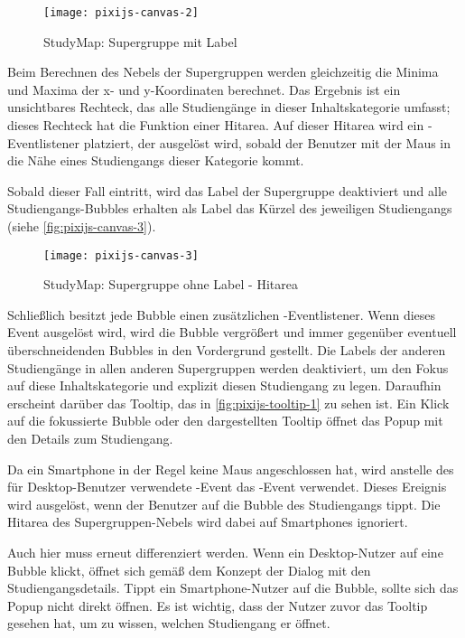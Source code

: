 \begin{figure}[H]
    \centering
    \texttt{[image: pixijs-canvas-2]}
    \caption{StudyMap: Supergruppe mit Label}
    \label{fig:pixijs-canvas-2}
\end{figure}

Beim Berechnen des Nebels der Supergruppen werden gleichzeitig die Minima und Maxima der x- und y-Koordinaten berechnet. Das Ergebnis ist ein unsichtbares Rechteck, das alle Studiengänge in dieser Inhaltskategorie umfasst; dieses Rechteck hat die Funktion einer Hitarea. Auf dieser Hitarea wird ein -Eventlistener platziert, der ausgelöst wird, sobald der Benutzer mit der Maus in die Nähe eines Studiengangs dieser Kategorie kommt.

Sobald dieser Fall eintritt, wird das Label der Supergruppe deaktiviert und alle Studiengangs-Bubbles erhalten als Label das Kürzel des jeweiligen Studiengangs (siehe \autoref{fig:pixijs-canvas-3}).

\begin{figure}[H]
    \centering
    \texttt{[image: pixijs-canvas-3]}
    \caption{StudyMap: Supergruppe ohne Label - Hitarea}
    \label{fig:pixijs-canvas-3}
\end{figure}

Schließlich besitzt jede Bubble einen zusätzlichen -Eventlistener. Wenn dieses Event ausgelöst wird, wird die Bubble vergrößert und immer gegenüber eventuell überschneidenden Bubbles in den Vordergrund gestellt. Die Labels der anderen Studiengänge in allen anderen Supergruppen werden deaktiviert, um den Fokus auf diese Inhaltskategorie und explizit diesen Studiengang zu legen. Daraufhin erscheint darüber das Tooltip, das in \autoref{fig:pixijs-tooltip-1} zu sehen ist. Ein Klick auf die fokussierte Bubble oder den dargestellten Tooltip öffnet das Popup mit den Details zum Studiengang.

Da ein Smartphone in der Regel keine Maus angeschlossen hat, wird anstelle des für Desktop-Benutzer verwendete -Event das -Event verwendet. Dieses Ereignis wird ausgelöst, wenn der Benutzer auf die Bubble des Studiengangs tippt. Die Hitarea des Supergruppen-Nebels wird dabei auf Smartphones ignoriert.

Auch hier muss erneut differenziert werden. Wenn ein Desktop-Nutzer auf eine Bubble klickt, öffnet sich gemäß dem Konzept der Dialog mit den Studiengangsdetails. Tippt ein Smartphone-Nutzer auf die Bubble, sollte sich das Popup nicht direkt öffnen. Es ist wichtig, dass der Nutzer zuvor das Tooltip gesehen hat, um zu wissen, welchen Studiengang er öffnet.

